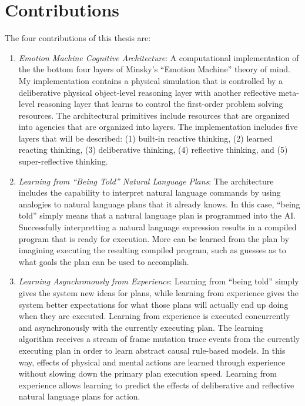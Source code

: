\section{Contributions}

The four contributions of this thesis are:
\begin{enumerate}
\item \emph{Emotion Machine Cognitive Architecture}: A computational
  implementation of the the bottom four layers of Minsky's ``Emotion
  Machine'' theory of mind.  My implementation contains a physical
  simulation that is controlled by a deliberative physical
  object-level reasoning layer with another reflective meta-level
  reasoning layer that learns to control the first-order problem
  solving resources.  The architectural primitives include resources
  that are organized into agencies that are organized into layers.
  The implementation includes five layers that will be described: (1)
  built-in reactive thinking, (2) learned reacting thinking, (3)
  deliberative thinking, (4) reflective thinking, and (5)
  super-reflective thinking.
\item \emph{Learning from ``Being Told'' Natural Language Plans}: The
  architecture includes the capability to interpret natural language
  commands by using analogies to natural language plans that it
  already knows.  In this case, ``being told'' simply means that a
  natural language plan is programmed into the AI.  Successfully
  interpretting a natural language expression results in a compiled
  program that is ready for execution.  More can be learned from the
  plan by imagining executing the resulting compiled program, such as
  guesses as to what goals the plan can be used to accomplish.
\item \emph{Learning Asynchronously from Experience}: Learning from
  ``being told'' simply gives the system new ideas for plans, while
  learning from experience gives the system better expectations for
  what those plans will actually end up doing when they are executed.
  Learning from experience is executed concurrently and asynchronously
  with the currently executing plan.  The learning algorithm receives
  a stream of frame mutation trace events from the currently executing
  plan in order to learn abstract causal rule-based models.  In this
  way, effects of physical and mental actions are learned through
  experience without slowing down the primary plan execution speed.
  Learning from experience allows learning to predict the effects of
  deliberative and reflective natural language plans for action.

\end{enumerate}
